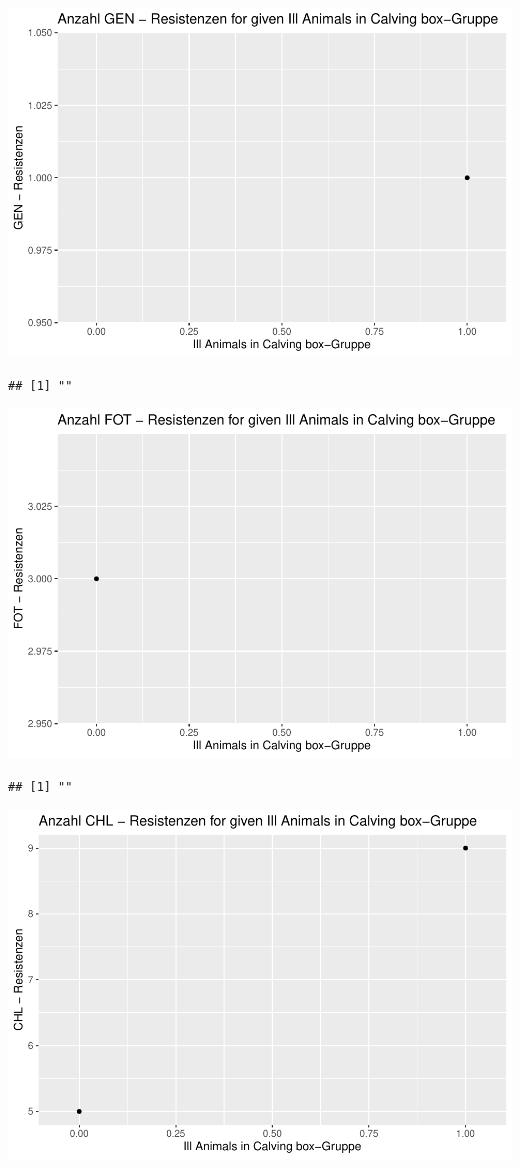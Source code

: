 \documentclass[
]{article}
\begin{document}
\includegraphics{NResistenzen_files/figure-latex/binary_or_nominal_variables-24.pdf}

\begin{verbatim}
## [1] ""
\end{verbatim}

\includegraphics{NResistenzen_files/figure-latex/binary_or_nominal_variables-25.pdf}

\begin{verbatim}
## [1] ""
\end{verbatim}

\includegraphics{NResistenzen_files/figure-latex/binary_or_nominal_variables-26.pdf}
\end{document}
